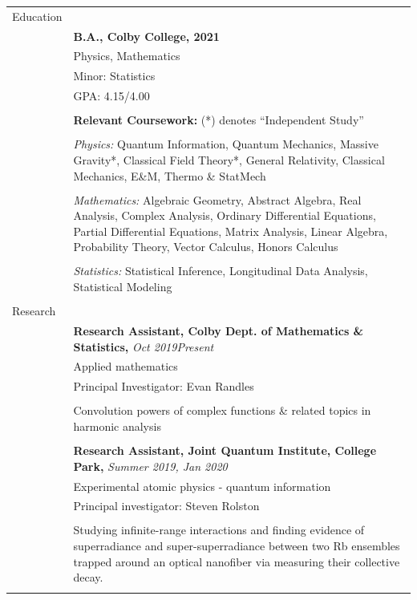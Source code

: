 \documentclass[10pt]{article}
\begin{document}
\noindent \begin{longtable}{ l m{13.5cm}   }

	
  \large{Education}    	& \\ 
  						& \textbf{B.A., Colby College, 2021} \\
     				 	& Physics, Mathematics \\
     				 	& Minor: Statistics  \\
     					& GPA: 4.15/4.00 \\
	 					& \\
	 					& \textbf{Relevant Coursework:} (*) denotes ``Independent Study'' \\ \vspace{-12pt}
	 					& \\
	 					& \textit{Physics:} Quantum Information, Quantum Mechanics, Massive Gravity*, Classical Field Theory*,  General Relativity, Classical Mechanics, E\&M, Thermo \& StatMech\\  \vspace{-9pt}
	 					& \\
	 					& \textit{Mathematics:} Algebraic Geometry, Abstract Algebra, Real Analysis, Complex Analysis, Ordinary Differential Equations, Partial Differential Equations, Matrix Analysis, Linear Algebra, Probability Theory, Vector Calculus, Honors Calculus\\   \vspace{-9pt}
	 					& \\ 
	 					& \textit{Statistics:} Statistical Inference, Longitudinal Data Analysis, Statistical Modeling\\
	 					& \\
    
        
  \large{Research}      & \\  
  						& \textbf{Research Assistant, Colby Dept. of Mathematics \& Statistics,} \textit{Oct 2019\textendash Present }\\
  						& Applied mathematics \\
  						& Principal Investigator: Evan Randles  \\ \vspace{-9pt}
  						& \\
  						& Convolution powers of complex functions \& related topics in harmonic analysis \\
  						& \\
  						
  						
  						& \textbf{Research Assistant, Joint Quantum Institute, College Park,} \textit{Summer 2019, Jan 2020}  \\
  						& Experimental atomic physics - quantum information \\
     					& Principal investigator:  Steven Rolston\\  \vspace{-9pt}
     					& \\
     					& Studying infinite-range interactions and finding evidence of superradiance and super-superradiance between two Rb ensembles trapped around an optical nanofiber via measuring their collective decay. \\
     					& \\
     					

\end{longtable}
\end{document}
